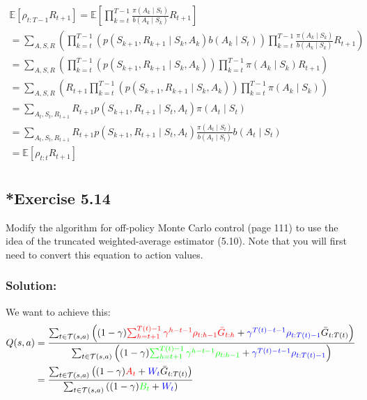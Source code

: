 \begin{multline*}
    \mathbb{E} \left[ \rho_{t:T-1} R_{t+1} \right] = \mathbb{E} \left[ \prod_{k=t}^{T-1} \frac{\pi(A_k \mid S_t)}{b(A_k \mid S_k)} R_{t+1} \right] \\
    = \sum_{A, S, R} \left(\prod_{k=t}^{T-1}\left( p(S_{k+1}, R_{k+1}\mid S_k, A_k) b(A_k \mid S_t) \right) \prod_{k=t}^{T-1} \frac{\pi(A_k \mid S_k)}{b(A_k \mid S_k)} R_{t+1} \right) \\
    = \sum_{A, S, R} \left(\prod_{k=t}^{T-1}\left( p(S_{k+1}, R_{k+1}\mid S_k, A_k) \right) \prod_{k=t}^{T-1} \pi(A_k \mid S_k) R_{t+1} \right) \\
    = \sum_{A, S, R} \left(  R_{t+1} \prod_{k=t}^{T-1}\left( p(S_{k+1}, R_{k+1}\mid S_k, A_k) \right) \prod_{k=t}^{T-1} \pi(A_k \mid S_k) \right) \\
    = \sum_{A_t, S_t, R_{t+1}}   R_{t+1} p(S_{k+1}, R_{t+1}\mid S_t, A_t) \pi(A_t \mid S_t) \\
    = \sum_{A_t, S_t, R_{t+1}}   R_{t+1} p(S_{k+1}, R_{t+1}\mid S_t, A_t) \frac{\pi(A_t \mid S_t)}{b(A_t \mid S_t)} b(A_t \mid S_t)\\
    = \mathbb{E} \left[ \rho_{t:t} R_{t+1} \right] \\
\end{multline*} 


\subsection*{*Exercise 5.14}
Modify the algorithm for off-policy Monte Carlo control (page 111) to use
the idea of the truncated weighted-average estimator (5.10). Note that you will first need
to convert this equation to action values. 

\subsubsection*{Solution:}
We want to achieve this:
\footnotesize
\begin{align*}
Q(s,a) &= \frac{\sum_{t \in \mathcal{T}(s,a)} \left( (1 - \gamma) \textcolor{red}{\sum_{h = t+1}^{T(t) - 1} \gamma^{h - t - 1} \rho_{t:h-1} \bar{G}_{t:h}} + \textcolor{blue}{\gamma^{T(t) - t - 1} \rho_{t:T(t) - 1}} \bar{G}_{t:T(t)} \right)}
{\sum_{t \in \mathcal{T}(s,a)} \left( (1 - \gamma) \textcolor{green}{\sum_{h = t+1}^{T(t) - 1} \gamma^{h - t - 1} \rho_{t:h-1}} + \textcolor{blue}{\gamma^{T(t) - t - 1} \rho_{t:T(t) - 1}} \right)} \\
    &= \frac{\sum_{t \in \mathcal{T}(s,a)} \left( (1 - \gamma) \textcolor{red}{A_t} + \textcolor{blue}{W_t} \bar{G}_{t:T(t)} \right)}
{\sum_{t \in \mathcal{T}(s,a)} \left( (1 - \gamma) \textcolor{green}{B_t} + \textcolor{blue}{W_t} \right)}
\end{align*}

